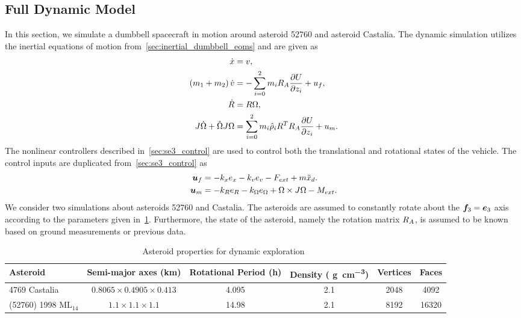 \subsection{Full Dynamic Model }\label{sec:dynamic_exploration}
In this section, we simulate a dumbbell spacecraft in motion around asteroid \num{52760} and asteroid Castalia.
The dynamic simulation utilizes the inertial equations of motion from~\cref{sec:inertial_dumbbell_eoms} and are given as
\begin{align*}
    \dot{x} &= v, \\
    \left( m_1 + m_2 \right) \dot{v} &= - \sum_{i=0}^2 m_i R_A \frac{\partial U}{\partial z_i} + u_f, \\
    \dot{R} &= R \Omega, \label{eq:inertial_attitude_dynamics}\\
    J \dot{\Omega} + \hat{\Omega} J \Omega &= \sum_{i=0}^2 m_i \hat{\rho}_i R^T R_A \frac{\partial U}{\partial z_i} + u_m. 
\end{align*}
The nonlinear controllers described in~\cref{sec:se3_control} are used to control both the translational and rotational states of the vehicle.
The control inputs are duplicated from~\cref{sec:se3_control} as
\begin{align*}
    \bm{u}_f &= -k_x e_x - k_v e_v - F_{ext} + m \ddot{x}_d . \\
    \bm{u}_m &= -k_R e_R - k_\Omega e_\Omega + \Omega \times J \Omega - M_{ext}.
\end{align*}
We consider two simulations about asteroids \num{52760} and Castalia.
The asteroids are assumed to constantly rotate about the \( \bm{f}_3 = \bm{e}_3\) axis according to the parameters given in~\cref{tab:dynamic_asteroids}.
Furthermore, the state of the asteroid, namely the rotation matrix \( R_A \), is assumed to be known based on ground measurements or previous data.
\begin{table}[htbp]
    \centering
    \begin{tabular}{lccccc}
        \toprule
        Asteroid & Semi-major axes (\si{\kilo\meter}) & Rotational Period (\si{\hour}) & Density ( \si{\gram\per\centi\meter^3})  & Vertices & Faces\\
        \midrule
        \num{4769} Castalia & \( 0.8065 \times 0.4905 \times 0.413 \) & \num{4.095} & 2.1 & 2048 & 4092 \\
        (\num{52760}) \num{1998} \(\text{ML}_{14}\) & \( 1.1 \times 1.1 \times 1.1 \) & \num{14.98} & 2.1 & 8192 & 16320  \\
        \bottomrule
    \end{tabular} 
    \caption{Asteroid properties for dynamic exploration~\label{tab:dynamic_asteroids}}
\end{table}
